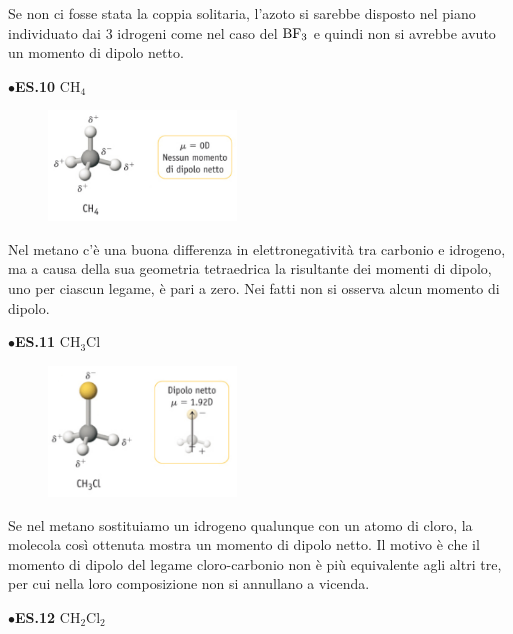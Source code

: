 Se non ci fosse stata la coppia solitaria, l'azoto si sarebbe disposto nel piano individuato dai 3 idrogeni come nel caso del $\rm BF_3$ e quindi non si avrebbe avuto un momento di dipolo netto.

\vspace{0.2cm}$\bullet$\textbf{ES.10} CH$_4$

\hspace{0.5cm}\begin{minipage}{0.2\textwidth}
\begin{figure}[H]
\includegraphics[width=5cm]{immagini/CH_4.png}
\end{figure}
\end{minipage} \hfill
\begin{minipage}{0.5\textwidth}
 Nel metano c'è una buona differenza in elettronegatività tra carbonio e idrogeno, ma a causa della sua geometria tetraedrica la risultante dei momenti di dipolo, uno per ciascun legame, è pari a zero. Nei fatti non si osserva alcun momento di dipolo.
\end{minipage}

\vspace{0.2cm}$\bullet$\textbf{ES.11} CH$_3$Cl

\hspace{0.5cm}\begin{minipage}{0.2\textwidth}
\begin{figure}[H]
\includegraphics[width=5cm]{immagini/CH_3Cl.png}
\end{figure}
\end{minipage} \hfill
\begin{minipage}{0.5\textwidth}
\vspace{0.4cm}Se nel metano sostituiamo un idrogeno qualunque con un atomo di cloro, la molecola così ottenuta mostra un momento di dipolo netto. Il motivo è che il momento di dipolo del legame cloro-carbonio non è più equivalente agli altri tre, per cui nella loro composizione non si annullano a vicenda.
\end{minipage}
\newpage
\vspace{0.2cm}$\bullet$\textbf{ES.12} CH$_2$Cl$_2$

